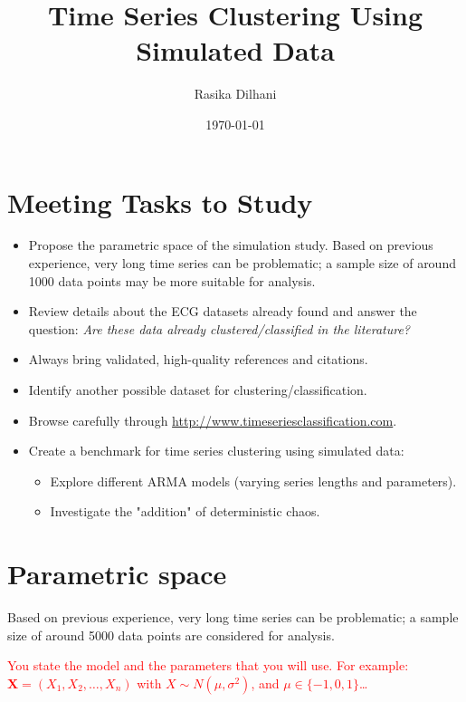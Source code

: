 \documentclass[12pt,a4paper]{article}
\title{Time Series Clustering Using Simulated Data}
\author{Rasika Dilhani}
\date{\today}
\begin{document}
	\maketitle
	
	\section*{Meeting Tasks to Study}
	
	\begin{itemize}
		\item Propose the parametric space of the simulation study.  
		Based on previous experience, very long time series can be problematic; a sample size of around 1000 data points may be more suitable for analysis.
		
		\item Review details about the ECG datasets already found and answer the question:  
		\textit{Are these data already clustered/classified in the literature?}
		
		\item Always bring validated, high-quality references and citations.
		
		\item Identify another possible dataset for clustering/classification.
		
		\item Browse carefully through \url{http://www.timeseriesclassification.com}.
		
		\item Create a benchmark for time series clustering using simulated data:
		\begin{itemize}
			\item Explore different ARMA models (varying series lengths and parameters).
			\item Investigate the "addition" of deterministic chaos.
		\end{itemize}
		
	\end{itemize}

	
\section{Parametric space}
  
Based on previous experience, very long time series can be problematic; a sample size of around 5000 data points are considered for analysis.

\textcolor{red}{You state the model and the parameters that you will use. For example: $\bm X=(X_1,X_2,\dots,X_n)$ with $X\sim N(\mu, \sigma^2)$, and $\mu\in\{-1,0,1\}$\dots}
\end{document}

